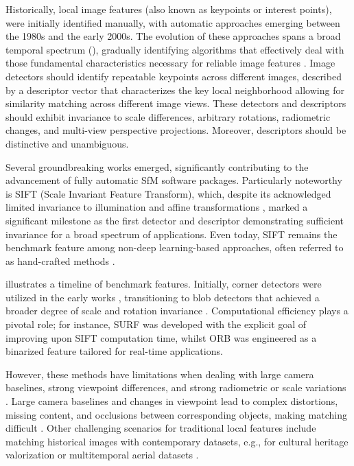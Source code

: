 Historically, local image features (also known as keypoints or interest points), were initially identified manually, with automatic approaches emerging between the 1980s and the early 2000s. 
The evolution of these approaches spans a broad temporal spectrum (), gradually identifying algorithms that effectively deal with those fundamental characteristics necessary for reliable image features \citep{Lowe2004}. 
Image detectors should identify repeatable keypoints across different images, described by a descriptor vector that characterizes the key local neighborhood allowing for similarity matching across different image views. 
These detectors and descriptors should exhibit invariance to scale differences, arbitrary rotations, radiometric changes, and multi-view perspective projections. 
Moreover, descriptors should be distinctive and unambiguous.  

Several groundbreaking works emerged, significantly contributing to the advancement of fully automatic SfM software packages. 
Particularly noteworthy is SIFT (Scale Invariant Feature Transform), which, despite its acknowledged limited invariance to illumination and affine transformations \citep{Lowe2004}, marked a significant milestone as the first detector and descriptor demonstrating sufficient invariance for a broad spectrum of applications. 
Even today, SIFT remains the benchmark feature among non-deep learning-based approaches, often referred to as hand-crafted methods \citep{jin_image_2021}. 

 illustrates a timeline of benchmark features. 
Initially, corner detectors were utilized in the early works \citep{Harris1988ACC}, 
transitioning to blob detectors that achieved a broader degree of scale and rotation invariance \citep{Lowe2004}. 
Computational efficiency plays a pivotal role; for instance, SURF \citep{bay_surf_2006} was developed with the explicit goal of improving upon SIFT computation time, whilst ORB \citep{Rublee2011} was engineered as a binarized feature tailored for real-time applications. 

However, these methods have limitations when dealing with large camera baselines, strong viewpoint differences, and strong radiometric or scale variations \citep{Yao_2021}. 
Large camera baselines and changes in viewpoint lead to complex distortions, missing content, and occlusions between corresponding objects, making matching difficult \citep{jin_image_2021, ioli2023_replicable}.
Other challenging scenarios for traditional local features include matching historical images with contemporary datasets, e.g., for cultural heritage valorization \citep{Maiwald2021_Historical, Maiwald2023_HAI-SFM} or multitemporal aerial datasets \citep{Farella2022, Zhang2021_featmatc_histo}.

